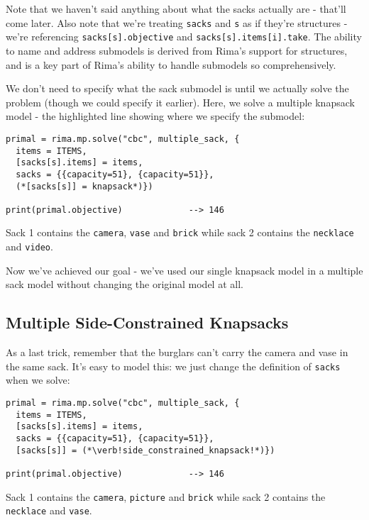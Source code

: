 \documentclass[a4paper,12pt]{article}
\begin{document}
Note that we haven't said anything about what the sacks actually are - that'll come later.
Also note that we're treating \lstinline!sacks! and \lstinline!s! as if they're structures -
we're referencing \lstinline!sacks[s].objective! and \lstinline!sacks[s].items[i].take!.
The ability to name and address submodels is derived from Rima's support for structures,
and is a key part of Rima's ability to handle submodels so comprehensively.

We don't need to specify what the sack submodel is until we actually solve the problem
(though we could specify it earlier).
Here, we solve a multiple knapsack model -
the highlighted line showing where we specify the submodel:

  \begin{lstlisting}
primal = rima.mp.solve("cbc", multiple_sack, {
  items = ITEMS,
  [sacks[s].items] = items,
  sacks = {{capacity=51}, {capacity=51}},
  (*[sacks[s]] = knapsack*)})

print(primal.objective)             --> 146
  \end{lstlisting}

Sack 1 contains the \lstinline!camera!, \lstinline!vase! and \lstinline!brick!
while sack 2 contains the \lstinline!necklace! and \lstinline!video!.

Now we've achieved our goal - we've used our single knapsack model in a
multiple sack model without changing the original model at all.


\subsection{Multiple Side-Constrained Knapsacks}

As a last trick, remember that the burglars can't carry the camera and vase in the same sack.
It's easy to model this: we just change the definition of \lstinline!sacks! when we solve:

  \begin{lstlisting}
primal = rima.mp.solve("cbc", multiple_sack, {
  items = ITEMS,
  [sacks[s].items] = items,
  sacks = {{capacity=51}, {capacity=51}},
  [sacks[s]] = (*\verb!side_constrained_knapsack!*)})

print(primal.objective)             --> 146
  \end{lstlisting}
  
Sack 1 contains the \lstinline!camera!, \lstinline!picture! and \lstinline!brick!
while sack 2 contains the \lstinline!necklace! and \lstinline!vase!.
\end{document}
